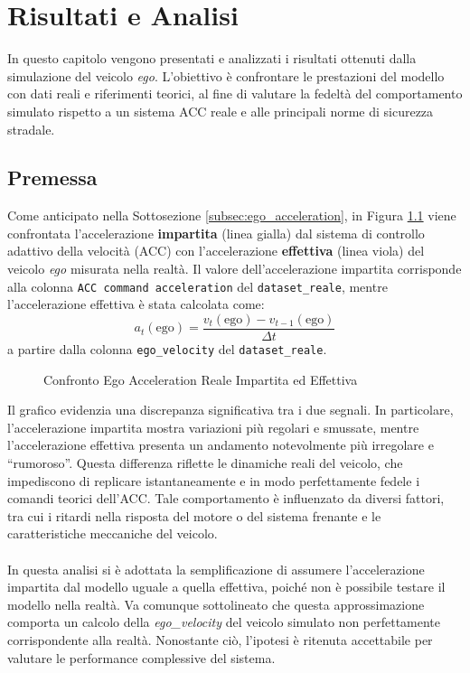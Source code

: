 \chapter{Risultati e Analisi}
\label{cha:risultati}
In questo capitolo vengono presentati e analizzati i risultati ottenuti dalla simulazione del veicolo \emph{ego}. 
L'obiettivo è confrontare le prestazioni del modello con dati reali e riferimenti teorici, al fine di valutare la 
fedeltà del comportamento simulato rispetto a un sistema ACC reale e alle principali norme di sicurezza stradale.

\section{Premessa}
\label{sec:premessa}
Come anticipato nella Sottosezione \ref{subsec:ego_acceleration}, in Figura \ref{fig:acceleration_effettiva_impartita} 
viene confrontata l'accelerazione \textbf{impartita} (linea gialla) dal sistema di controllo adattivo della velocità (ACC) 
con l'accelerazione \textbf{effettiva} (linea viola) del veicolo \emph{ego} misurata nella realtà.  
Il valore dell'accelerazione impartita corrisponde alla colonna \texttt{ACC command acceleration} del \texttt{dataset\_reale}, 
mentre l'accelerazione effettiva è stata calcolata come:
\[
a_t(\mathrm{ego}) = \frac{v_t(\mathrm{ego}) - v_{t-1}(\mathrm{ego})}{\Delta t}
\]
a partire dalla colonna \texttt{ego\_velocity} del \texttt{dataset\_reale}.
\begin{figure}[H]
    \centering
    \caption{Confronto Ego Acceleration Reale Impartita ed Effettiva}
    \label{fig:acceleration_effettiva_impartita}
\end{figure}
\noindent Il grafico evidenzia una discrepanza significativa tra i due segnali.  
In particolare, l'accelerazione impartita mostra variazioni più regolari e smussate, mentre l'accelerazione effettiva presenta un andamento 
notevolmente più irregolare e “rumoroso”.  
Questa differenza riflette le dinamiche reali del veicolo, che impediscono di replicare istantaneamente e in modo perfettamente fedele 
i comandi teorici dell'ACC.  
Tale comportamento è influenzato da diversi fattori, tra cui i ritardi nella risposta del motore o del sistema frenante 
e le caratteristiche meccaniche del veicolo.
\\\\
\noindent In questa analisi si è adottata la semplificazione di assumere l'accelerazione impartita dal modello uguale a quella 
effettiva, poiché non è possibile testare il modello nella realtà. Va comunque sottolineato che questa approssimazione 
comporta un calcolo della \emph{ego\_velocity} del veicolo simulato non perfettamente corrispondente alla realtà.  
Nonostante ciò, l'ipotesi è ritenuta accettabile per valutare le performance complessive del sistema.







